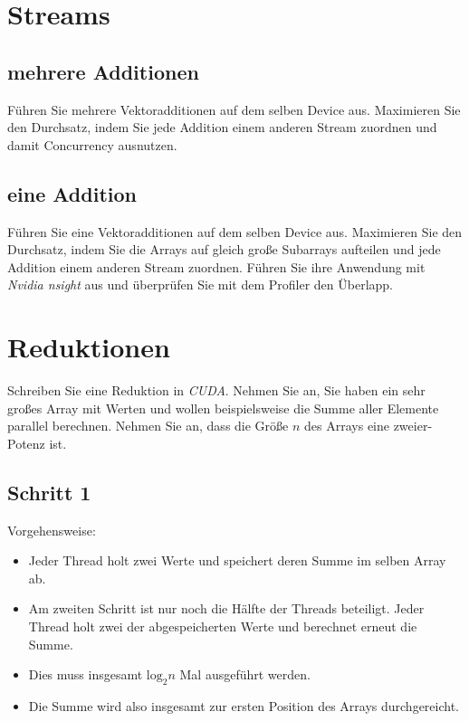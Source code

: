 \documentclass[headsepline=3pt,headinclude=true,12pt,oneside]{scrartcl}
\begin{document}
	\section{Streams}
	\subsection*{mehrere Additionen}
	Führen Sie mehrere Vektoradditionen auf dem selben Device aus. Maximieren Sie den Durchsatz, indem Sie jede Addition einem anderen Stream zuordnen und damit Concurrency ausnutzen.
	\subsection*{eine Addition}
	Führen Sie eine Vektoradditionen auf dem selben Device aus. Maximieren Sie den Durchsatz, indem Sie die Arrays auf gleich große Subarrays aufteilen und jede Addition einem anderen Stream zuordnen. Führen Sie ihre Anwendung mit \textit{Nvidia nsight} aus und überprüfen Sie mit dem Profiler den Überlapp.
	
	\section{Reduktionen}
	Schreiben Sie eine Reduktion in \textit{CUDA}. Nehmen Sie an, Sie haben ein sehr großes Array mit Werten und wollen beispielsweise die Summe aller Elemente parallel berechnen. Nehmen Sie an, dass die Größe $n$ des Arrays eine zweier-Potenz ist.
		
		\subsection*{Schritt 1}
		Vorgehensweise:
		
		\begin{itemize}
			\item Jeder Thread holt zwei Werte und speichert deren Summe im selben Array ab.
			\item Am zweiten Schritt ist nur noch die Hälfte der Threads beteiligt. Jeder Thread holt zwei der abgespeicherten Werte und berechnet erneut die Summe.
			\item Dies muss insgesamt $\text{log}_2 n$ Mal ausgeführt werden.
			\item Die Summe wird also insgesamt zur ersten Position des Arrays durchgereicht.
		\end{itemize}
		
\end{document}
